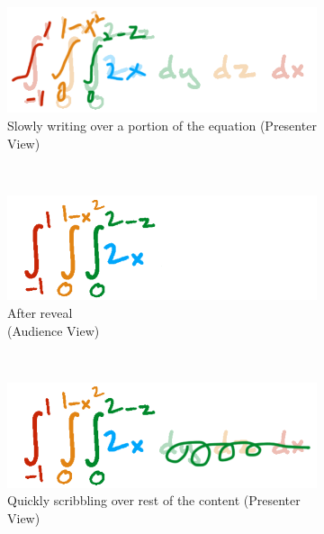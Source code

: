 \begin{figure}[h!]
    \centering
    \begin{subfigure}[t]{0.4\columnwidth}
        \centering
        \includegraphics[width=1\columnwidth]{figures/slowink_presenter}
                \captionsetup{font=footnotesize}
\caption{Slowly writing over a portion of the equation (Presenter View)}
    \end{subfigure}%
    ~ ~
    \begin{subfigure}[t]{0.4\columnwidth}
        \centering
        \includegraphics[width=1\columnwidth]{figures/slowink_audience}
                \captionsetup{font=footnotesize}
\caption{After reveal \\ (Audience View)}
    \end{subfigure}
         ~   ~
      \begin{subfigure}[t]{0.4\columnwidth}
        \centering
        \includegraphics[width=1\columnwidth]{figures/fastink_presenter}
                \captionsetup{font=footnotesize}
\caption{Quickly scribbling over rest of the content (Presenter View)}
    \end{subfigure}%
    ~ ~
    \begin{subfigure}[t]{0.4\columnwidth}

\end{subfigure}
\end{figure}
